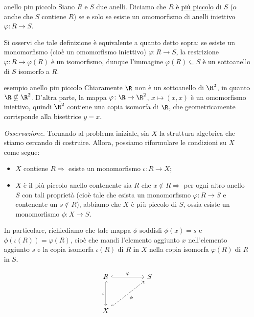 \begin{defn}{anello piu piccolo}
Siano $R$ e $S$ due anelli. Diciamo che $R$ è \underline{più piccolo} di $S$ (o anche che $S$ contiene $R$) 
se e solo se esiste un omomorfismo di anelli iniettivo $\varphi \colon R\to S$.
\end{defn} 

\noindent Si osservi che tale definizione è equivalente a quanto detto sopra: se esiste un monomorfismo 
(cioè un omomorfismo iniettivo) $\varphi\colon R\to S$, la restrizione $\varphi\colon R\to \varphi(R)$ è un isomorfismo, 
dunque l'immagine $\varphi(R)\subseteq S$ è un sottoanello di $S$ isomorfo a $R$.

\begin{example}[]{esempio anello piu piccolo}
Chiaramente $\R$ non è un sottoanello di $\R^2$, in quanto $\R\not\subseteq \R^2$. D'altra parte, la mappa 
$\varphi\colon \R\to \R^2$, $x\mapsto (x,x)$ è un omomorfismo iniettivo, quindi $\R^2$ contiene una copia isomorfa di $\R$, 
che geometricamente corrisponde alla bisettrice $y=x$.
\end{example}

\noindent\emph{Osservazione.} Tornando al problema iniziale, sia $X$ la struttura algebrica che stiamo cercando di costruire. 
Allora, possiamo riformulare le condizioni su $X$ come segue:

\begin{itemize}
\item $X$ contiene $R\Rightarrow$ esiste un monomorfismo $\iota\colon R\to X$;
\item $X$ è il più piccolo anello contenente sia $R$ che $x\notin R\Rightarrow$ per ogni altro anello $S$ 
con tali proprietà (cioè tale che esista un monomorfismo $\varphi\colon R\to S$ e contenente un $s\notin R$), 
abbiamo che $X$ è più piccolo di $S$, ossia esiste un monomorfismo $\phi\colon X\to S$. 
\end{itemize}

\noindent In particolare, richiediamo che tale mappa $\phi$ soddisfi $\phi(x)=s$ e $\phi(\iota(R))=\varphi(R)$, 
cioè che mandi l'elemento aggiunto $x$ nell'elemento aggiunto $s$ e la copia isomorfa $\iota(R)$ di $R$ in $X$ 
nella copia isomorfa $\varphi(R)$ di $R$ in $S$.

\[
\begin{tikzcd}
R \arrow[rr, "\varphi", hook] \arrow[dd, "\iota"', hook] &  & S \\
                                                         &  &   \\
X \arrow[rruu, "\phi"', dashed, hook]                    &  &  
\end{tikzcd}
\]

